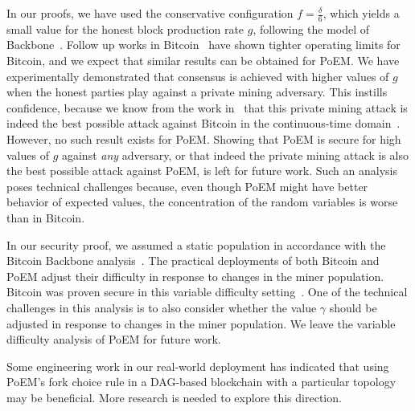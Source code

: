 \noindent
{}
In our proofs, we have used the conservative configuration $f = \frac{\delta}{6}$,
which yields a small value for the honest block production rate $g$, following the model
of Backbone~\cite{backbone}. Follow up works in Bitcoin~\cite{eiar,tight-bounds} have shown tighter
operating limits for Bitcoin, and we expect that similar results can be obtained for PoEM.
We have experimentally demonstrated that consensus is achieved with higher values
of $g$ when the honest parties play against a private mining adversary. This instills
confidence, because we know from the work in~\cite{eiar} that this private mining attack
is indeed the best possible attack against Bitcoin in the continuous-time domain~\cite{bitcoin-made-simple}.
However, no such result exists for
PoEM. Showing that PoEM is secure for high values of $g$ against \emph{any} adversary,
or that indeed the private mining attack is also the best possible attack against PoEM,
is left for future work. Such an analysis poses technical challenges because, even though
PoEM might have better behavior of expected values, the concentration of the random
variables is worse than in Bitcoin.

\noindent
{}
In our security proof, we assumed a static population in accordance with
the Bitcoin Backbone analysis~\cite{backbone}. The practical deployments of
both Bitcoin and PoEM adjust their difficulty in response to changes in the
miner population. Bitcoin was proven secure in this variable difficulty
setting~\cite{varbackbone}. One of the technical challenges in this analysis
is to also consider whether the value $\gamma$ should be adjusted in response
to changes in the miner population.
We leave the variable difficulty analysis of PoEM
for future work.

\noindent
\myparagraph[DAGs]
Some engineering work in our real-world deployment has indicated that using
PoEM's fork choice rule in a DAG-based blockchain with a particular topology
may be beneficial. More research is needed to explore this direction.
